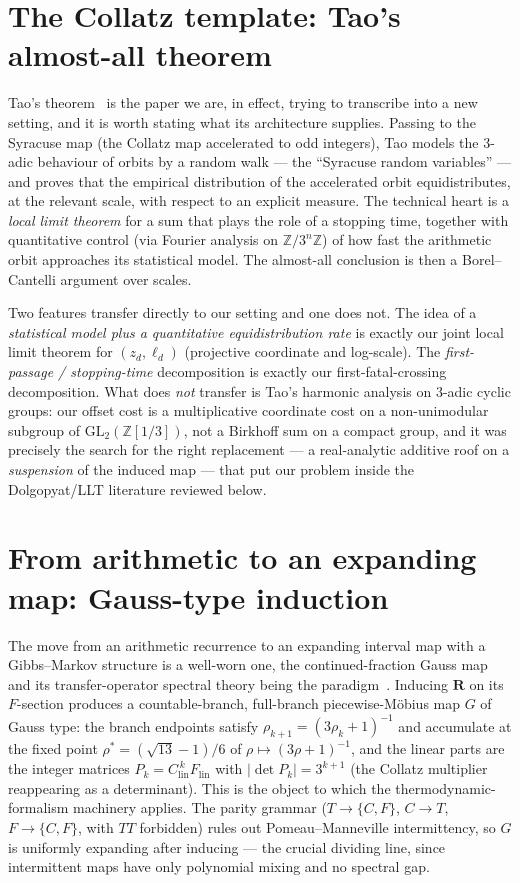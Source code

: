 \documentclass[11pt]{article}
\newcommand{\R}{\mathbf{R}}
\begin{document}
\section{The Collatz template: Tao's almost-all theorem}
\label{sec:tao}

Tao's theorem~\cite{Tao2022} is the paper we are, in effect, trying to
transcribe into a new setting, and it is worth stating what its architecture
supplies. Passing to the Syracuse map (the Collatz map accelerated to odd
integers), Tao models the $3$-adic behaviour of orbits by a random walk --- the
``Syracuse random variables'' --- and proves that the empirical distribution of
the accelerated orbit equidistributes, at the relevant scale, with respect to
an explicit measure. The technical heart is a \emph{local limit theorem} for a
sum that plays the role of a stopping time, together with quantitative control
(via Fourier analysis on $\mathbb Z/3^n\mathbb Z$) of how fast the arithmetic
orbit approaches its statistical model. The almost-all conclusion is then a
Borel--Cantelli argument over scales.

Two features transfer directly to our setting and one does not. The idea of a
\emph{statistical model plus a quantitative equidistribution rate} is exactly
our joint local limit theorem for $(z_d,\ell_d)$ (projective coordinate and
log-scale). The \emph{first-passage / stopping-time} decomposition is exactly
our first-fatal-crossing decomposition. What does \emph{not} transfer is Tao's
harmonic analysis on $3$-adic cyclic groups: our offset cost is a
multiplicative coordinate cost on a non-unimodular subgroup of
$\mathrm{GL}_2(\mathbb Z[1/3])$, not a Birkhoff sum on a compact group, and it
was precisely the search for the right replacement --- a real-analytic additive
roof on a \emph{suspension} of the induced map --- that put our problem inside
the Dolgopyat/LLT literature reviewed below.

\section{From arithmetic to an expanding map: Gauss-type induction}
\label{sec:induction}

The move from an arithmetic recurrence to an expanding interval map with a
Gibbs--Markov structure is a well-worn one, the continued-fraction Gauss map
and its transfer-operator spectral theory being the paradigm~\cite{Mayer1990}.
Inducing $\R$ on its
$F$-section produces a countable-branch, full-branch piecewise-M\"obius map
$G$ of Gauss type: the branch endpoints satisfy
$\rho_{k+1}=(3\rho_k+1)^{-1}$ and accumulate at the fixed point
$\rho^\ast=(\sqrt{13}-1)/6$ of $\rho\mapsto(3\rho+1)^{-1}$, and the linear
parts are the integer matrices $P_k=C_{\mathrm{lin}}^{\,k}F_{\mathrm{lin}}$ with
$|\det P_k|=3^{k+1}$ (the Collatz multiplier reappearing as a determinant).
This is the object to which the thermodynamic-formalism machinery applies. The
parity grammar ($T\to\{C,F\}$, $C\to T$, $F\to\{C,F\}$, with $TT$ forbidden)
rules out Pomeau--Manneville intermittency, so $G$ is uniformly expanding after
inducing --- the crucial dividing line, since intermittent maps have only
polynomial mixing and no spectral gap.
\end{document}
